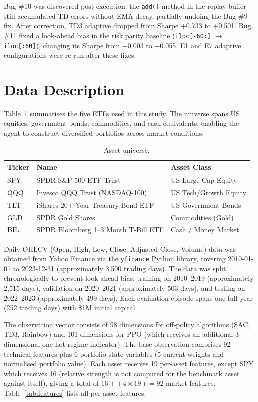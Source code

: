 \documentclass[11pt,a4paper]{article}
\begin{document}
Bug \#10 was discovered post-execution: the \texttt{add()} method in the replay buffer still accumulated TD errors without EMA decay, partially undoing the Bug \#9 fix. After correction, TD3 adaptive dropped from Sharpe +0.733 to +0.501. Bug \#11 fixed a look-ahead bias in the risk parity baseline (\texttt{iloc[-60:]} $\to$ \texttt{iloc[:60]}), changing its Sharpe from +0.003 to $-$0.055. E1 and E7 adaptive configurations were re-run after these fixes.


\section{Data Description}
\label{app:data}

Table~\ref{tab:assets} summarises the five ETFs used in this study. The universe spans US equities, government bonds, commodities, and cash equivalents, enabling the agent to construct diversified portfolios across market conditions.

\begin{table}[H]
\centering
\caption{Asset universe.}
\label{tab:assets}
\begin{tabular}{lll}
\toprule
Ticker & Name & Asset Class \\
\midrule
SPY & SPDR S\&P 500 ETF Trust & US Large-Cap Equity \\
QQQ & Invesco QQQ Trust (NASDAQ-100) & US Tech/Growth Equity \\
TLT & iShares 20+ Year Treasury Bond ETF & US Government Bonds \\
GLD & SPDR Gold Shares & Commodities (Gold) \\
BIL & SPDR Bloomberg 1--3 Month T-Bill ETF & Cash / Money Market \\
\bottomrule
\end{tabular}
\end{table}

Daily OHLCV (Open, High, Low, Close, Adjusted Close, Volume) data was obtained from Yahoo Finance via the \texttt{yfinance} Python library, covering 2010-01-01 to 2023-12-31 (approximately 3,500 trading days). The data was split chronologically to prevent look-ahead bias: training on 2010--2019 (approximately 2,515 days), validation on 2020--2021 (approximately 503 days), and testing on 2022--2023 (approximately 499 days). Each evaluation episode spans one full year (252 trading days) with \$1M initial capital.

The observation vector consists of 98 dimensions for off-policy algorithms (SAC, TD3, Rainbow) and 101 dimensions for PPO (which receives an additional 3-dimensional one-hot regime indicator). The base observation comprises 92 technical features plus 6 portfolio state variables (5 current weights and normalised portfolio value). Each asset receives 19 per-asset features, except SPY which receives 16 (relative strength is not computed for the benchmark asset against itself), giving a total of $16 + (4 \times 19) = 92$ market features. Table~\ref{tab:features} lists all per-asset features.
\end{document}
